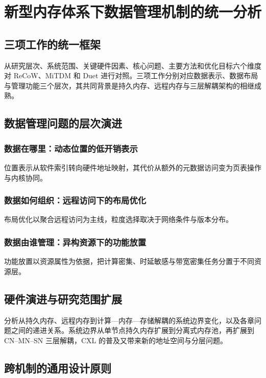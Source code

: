 \chapter{新型内存体系下数据管理机制的统一分析}

\section{三项工作的统一框架}
从研究层次、系统范围、关键硬件因素、核心问题、主要方法和优化目标六个维度对 ReCoW、MiTDM 和 Duet 进行对照。三项工作分别对应数据表示、数据布局与管理功能三个层次，其共同背景是持久内存\cite{izraelevitzBasic2019,yangEmpirical2020}、远程内存\cite{guoClio2022,shanLeGo2018}与三层解耦架构\cite{caoPolardb2021,liGaussdb2024}的相继成熟。
\section{数据管理问题的层次演进}
\subsection{数据在哪里：动态位置的低开销表示}
位置表示从软件索引转向硬件地址映射\cite{liCtfs2022,marmolLibpm2018}，其代价从额外的元数据访问变为页表操作与内核协同。
\subsection{数据如何组织：远程访问下的布局优化}
布局优化以聚合远程访问为主线\cite{caiEfficient2018,zhangMotor2024}，粒度选择取决于网络条件与版本分布\cite{binnigEnd2016,zamanianEnd2017}。
\subsection{数据由谁管理：异构资源下的功能放置}
功能放置以资源属性为依据\cite{caoPolardb2021,zhangTowards2021}，把计算密集、时延敏感与带宽密集任务分置于不同资源层。
\section{硬件演进与研究范围扩展}
分析从持久内存、远程内存到计算—内存—存储解耦的系统边界变化，以及各章问题之间的递进关系。系统边界从单节点持久内存\cite{scargallProgramming2020}扩展到分离式内存池\cite{aguileraRemote2018,limDisaggregated2009}，再扩展到 CN--MN--SN 三层解耦\cite{yangPolardb2024,depoutovitchTaurus2023}，CXL 的普及又带来新的地址空间与分层问题\cite{cxlConsortium2025,liPond2023}。
\section{跨机制的通用设计原则}

